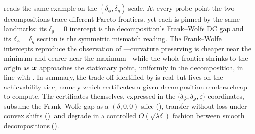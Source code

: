  reads the same example on the
$(\delta_\phi,\delta_g)$ scale. At every probe point the two
decompositions trace different Pareto frontiers, yet each is pinned by
the same landmarks: its $\delta_g=0$ intercept is the decomposition's
Frank--Wolfe DC gap and its $\delta_\phi=\delta_g$ section is the
symmetric mismatch reading. The Frank--Wolfe intercepts reproduce the
observation of \citet{maskan2025}---curvature preserving is cheaper near
the minimum and dearer near the maximum---while the whole frontier
shrinks to the origin as $\bar{\bm{x}}$ approaches the stationary point,
uniformly in the decomposition, in line with
. In summary, the
trade-off identified by \citet{maskan2025} is real but lives on the
achievability side, namely which certificates a given decomposition
renders cheap to compute. The certificates themselves, expressed in the
$(\delta_\phi,\delta_g,\varepsilon)$ coordinates, subsume the Frank--Wolfe gap
as a $(\delta,0,0)$-slice (), transfer without
loss under convex shifts (), and
degrade in a controlled $O(\sqrt{\lambda\delta})$ fashion between
smooth decompositions
().

